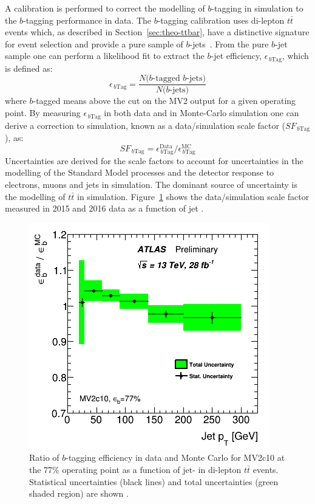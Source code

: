 A calibration is performed to correct the modelling of $b$-tagging in simulation to the $b$-tagging performance in data.
The $b$-tagging calibration uses di-lepton $t\bar{t}$ events which, as described in Section~\ref{sec:theo-ttbar},
have a distinctive signature for event selection and provide a pure sample of $b$-jets~\cite{obj-bjets_calib_tech,obj-bjets_calib_plots}.
From the pure $b$-jet sample one can perform a likelihood fit to extract the $b$-jet efficiency, $\epsilon_{\,b\text{Tag}}$, which is defined as:
\begin{equation}
 \epsilon_{\,b\text{Tag}} = \frac{N(\text{$b$-tagged $b$-jets)}}{N(\text{$b$-jets)}}
\end{equation}
where $b$-tagged means above the cut on the MV2 output for a given operating point.
By measuring $\epsilon_{\,b\text{Tag}}$ in both data and in Monte-Carlo simulation one can derive
a correction to simulation, known as a data/simulation scale factor ($SF_{\,b\text{Tag}}$), as:
\begin{equation}
 SF_{\,b\text{Tag}} = \epsilon_{\,b\text{Tag}}^{\text{Data}}/\epsilon_{\,b\text{Tag}}^{\text{MC}}
\end{equation}
Uncertainties are derived for the scale factors 
to account for uncertainties in the modelling of the Standard Model processes and the detector response to electrons, muons and jets in simulation.
The dominant source of uncertainty is the modelling of $t\bar{t}$ in simulation.
Figure~\ref{fig:obj-bjets_calib} shows the data/simulation scale factor measured in 2015 and 2016 data as a function of jet \pT{}.

\begin{figure}[!ht]
  \begin{center}
    \includegraphics[width=0.57\linewidth, angle=0]{figs/Objects/bjets_calib_pt.png} 
  \end{center}
  \vspace{-1em}
  \caption[Ratio of $b$-tagging efficiency in data and Monte Carlo simulation for MV2c10 at the 77\% operating point as a function of jet-\pT{} in di-lepton $t\bar{t}$ events.]
          {\label{fig:obj-bjets_calib} Ratio of $b$-tagging efficiency in data and Monte Carlo for MV2c10 at the 77\% operating point as a function of jet-\pT{}
  in di-lepton $t\bar{t}$ events. Statistical uncertainties (black lines) and total uncertainties (green shaded region) are shown \cite{obj-bjets_calib_plots}.}
\end{figure}

